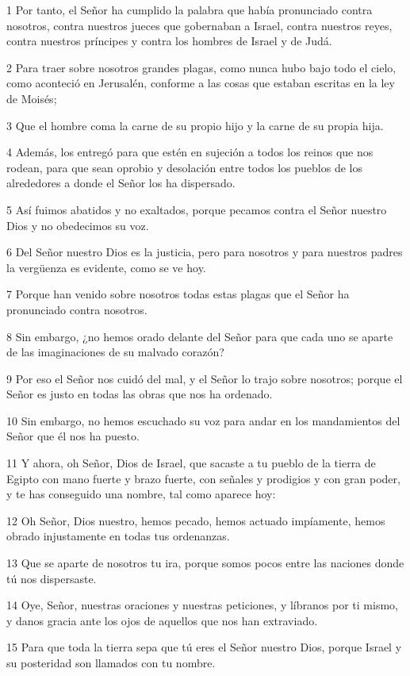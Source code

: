 \par 1 Por tanto, el Señor ha cumplido la palabra que había pronunciado contra nosotros, contra nuestros jueces que gobernaban a Israel, contra nuestros reyes, contra nuestros príncipes y contra los hombres de Israel y de Judá.
\par 2 Para traer sobre nosotros grandes plagas, como nunca hubo bajo todo el cielo, como aconteció en Jerusalén, conforme a las cosas que estaban escritas en la ley de Moisés;
\par 3 Que el hombre coma la carne de su propio hijo y la carne de su propia hija.
\par 4 Además, los entregó para que estén en sujeción a todos los reinos que nos rodean, para que sean oprobio y desolación entre todos los pueblos de los alrededores a donde el Señor los ha dispersado.
\par 5 Así fuimos abatidos y no exaltados, porque pecamos contra el Señor nuestro Dios y no obedecimos su voz.
\par 6 Del Señor nuestro Dios es la justicia, pero para nosotros y para nuestros padres la vergüenza es evidente, como se ve hoy.
\par 7 Porque han venido sobre nosotros todas estas plagas que el Señor ha pronunciado contra nosotros.
\par 8 Sin embargo, ¿no hemos orado delante del Señor para que cada uno se aparte de las imaginaciones de su malvado corazón?
\par 9 Por eso el Señor nos cuidó del mal, y el Señor lo trajo sobre nosotros; porque el Señor es justo en todas las obras que nos ha ordenado.
\par 10 Sin embargo, no hemos escuchado su voz para andar en los mandamientos del Señor que él nos ha puesto.
\par 11 Y ahora, oh Señor, Dios de Israel, que sacaste a tu pueblo de la tierra de Egipto con mano fuerte y brazo fuerte, con señales y prodigios y con gran poder, y te has conseguido una nombre, tal como aparece hoy:
\par 12 Oh Señor, Dios nuestro, hemos pecado, hemos actuado impíamente, hemos obrado injustamente en todas tus ordenanzas.
\par 13 Que se aparte de nosotros tu ira, porque somos pocos entre las naciones donde tú nos dispersaste.
\par 14 Oye, Señor, nuestras oraciones y nuestras peticiones, y líbranos por ti mismo, y danos gracia ante los ojos de aquellos que nos han extraviado.
\par 15 Para que toda la tierra sepa que tú eres el Señor nuestro Dios, porque Israel y su posteridad son llamados con tu nombre.
